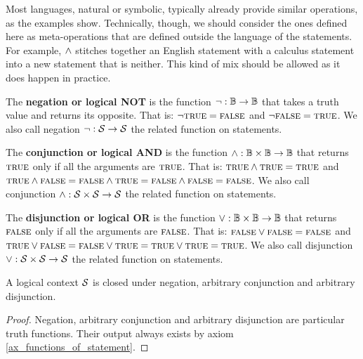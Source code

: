 \documentclass[11pt,letterpaper,fleqn]{memoir} %
\begin{document}
Most languages, natural or symbolic, typically already provide similar operations, as the examples show. Technically, though, we should consider the ones defined here as meta-operations that are defined outside the language of the statements. For example, $\wedge$ stitches together an English statement with a calculus statement into a new statement that is neither. This kind of mix should be allowed as it does happen in practice.

\begin{mathSection}
	\begin{defn}
		The \textbf{negation or logical NOT} is the function $\neg : \mathbb{B} \to \mathbb{B}$ that takes a truth value and returns its opposite. That is: $\neg \textsc{true} = \textsc{false}$ and $\neg \textsc{false} = \textsc{true}$. We also call negation $\neg: \mathcal{S} \to \mathcal{S}$ the related function on statements.
	\end{defn}
	
	\begin{defn}
		The \textbf{conjunction or logical AND} is the function $\wedge : \mathbb{B} \times \mathbb{B} \to \mathbb{B}$ that returns $\textsc{true}$ only if all the arguments are $\textsc{true}$. That is: $\textsc{true} \wedge \textsc{true} = \textsc{true}$ and $\textsc{true} \wedge \textsc{false} =\textsc{false} \wedge \textsc{true} =\textsc{false} \wedge \textsc{false} = \textsc{false}$. We also call conjunction $\wedge : \mathcal{S} \times \mathcal{S} \to \mathcal{S}$ the related function on statements.
	\end{defn}
	
	\begin{defn}
		The \textbf{disjunction or logical OR} is the function $\vee : \mathbb{B} \times \mathbb{B} \to \mathbb{B}$ that returns $\textsc{false}$ only if all the arguments are $\textsc{false}$. That is: $\textsc{false} \vee \textsc{false} = \textsc{false}$ and $\textsc{true} \vee \textsc{false} =\textsc{false} \vee \textsc{true} =\textsc{true} \vee \textsc{true} = \textsc{true}$.  We also call disjunction $\vee : \mathcal{S} \times \mathcal{S} \to \mathcal{S}$ the related function on statements.
	\end{defn}

	\begin{prop}
	A logical context $\mathcal{S}$ is closed under negation, arbitrary conjunction and arbitrary disjunction.
\end{prop}
\begin{proof}
	Negation, arbitrary conjunction and arbitrary disjunction are particular truth functions. Their output always exists by axiom \eqref{ax_functions_of_statement}.
\end{proof}\end{mathSection}
\end{document}
